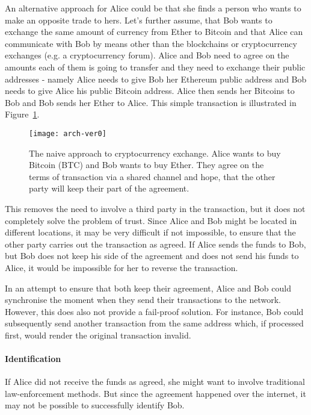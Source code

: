 An alternative approach for Alice could be that she finds a person who wants to make an opposite trade to hers. Let's further assume, that Bob wants to exchange the same amount of currency from Ether to Bitcoin and that Alice can communicate with Bob by means other than the blockchains or cryptocurrency exchanges (e.g. a cryptocurrency forum). Alice and Bob need to agree on the amounts each of them is going to transfer and they need to exchange their public addresses - namely Alice needs to give Bob her Ethereum public address and Bob needs to give Alice his public Bitcoin address. Alice then sends her Bitcoins to Bob and Bob sends her Ether to Alice. This simple transaction is illustrated in Figure~\ref{fig:arch-ver0}.

\begin{figure}[ht]
    \centering
    \texttt{[image: arch-ver0]}
    \caption{The naive approach to cryptocurrency exchange. Alice wants to buy Bitcoin (BTC) and Bob wants to buy Ether. They agree on the terms of transaction via a shared channel and hope, that the other party will keep their part of the agreement.}
    \label{fig:arch-ver0}
\end{figure}

This removes the need to involve a third party in the transaction, but it does not completely solve the problem of trust. Since Alice and Bob might be located in different locations, it may be very difficult if not impossible, to ensure that the other party carries out the transaction as agreed. If Alice sends the funds to Bob, but Bob does not keep his side of the agreement and does not send his funds to Alice, it would be impossible for her to reverse the transaction. 

In an attempt to ensure that both keep their agreement, Alice and Bob could synchronise the moment when they send their transactions to the network. However, this does also not provide a fail-proof solution. For instance, Bob could subsequently send another transaction from the same address which, if processed first, would render the original transaction invalid.

\paragraph{Identification} 
If Alice did not receive the funds as agreed, she might want to involve traditional law-enforcement methods. But since the agreement happened over the internet, it may not be possible to successfully identify Bob.

